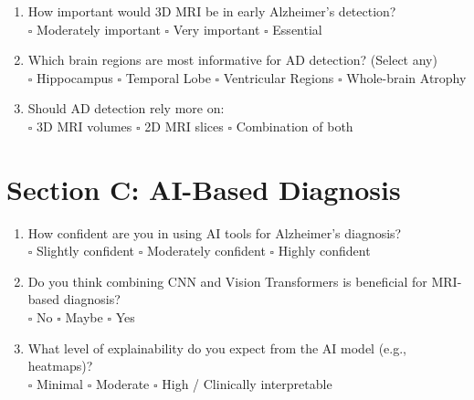 \begin{enumerate}[resume]
\item How important would 3D MRI be in early Alzheimer’s detection?\\
$\square$ Moderately important \hspace{0.3cm}
$\square$ Very important \hspace{0.3cm}
$\square$ Essential

\item Which brain regions are most informative for AD detection? (Select any)\\
$\square$ Hippocampus \hspace{0.3cm}
$\square$ Temporal Lobe \hspace{0.3cm}
$\square$ Ventricular Regions \hspace{0.3cm}
$\square$ Whole-brain Atrophy

\item Should AD detection rely more on:\\
$\square$ 3D MRI volumes \hspace{0.3cm}
$\square$ 2D MRI slices \hspace{0.3cm}
$\square$ Combination of both
\end{enumerate}


\section*{Section C: AI-Based Diagnosis}

\begin{enumerate}[resume]
\item How confident are you in using AI tools for Alzheimer’s diagnosis?\\
$\square$ Slightly confident \hspace{0.3cm}
$\square$ Moderately confident \hspace{0.3cm}
$\square$ Highly confident

\item Do you think combining CNN and Vision Transformers is beneficial for MRI-based diagnosis?\\
$\square$ No \hspace{0.3cm}
$\square$ Maybe \hspace{0.3cm}
$\square$ Yes

\item What level of explainability do you expect from the AI model (e.g., heatmaps)?\\
$\square$ Minimal \hspace{0.3cm}
$\square$ Moderate \hspace{0.3cm}
$\square$ High / Clinically interpretable
\end{enumerate}


